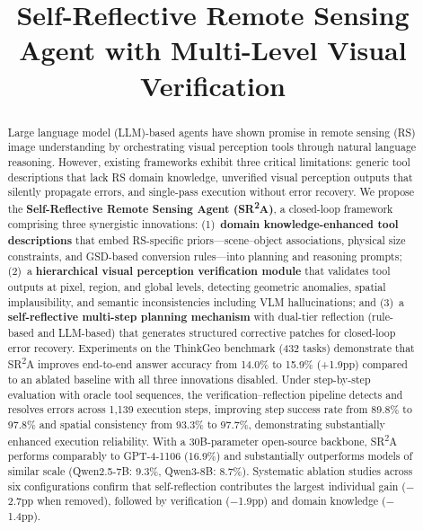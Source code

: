 \documentclass[journal]{IEEEtran}
\begin{document}
\title{Self-Reflective Remote Sensing Agent with Multi-Level Visual Verification}

\author{
}

\maketitle

\begin{abstract}
Large language model (LLM)-based agents have shown promise in remote sensing (RS) image understanding by orchestrating visual perception tools through natural language reasoning.
However, existing frameworks exhibit three critical limitations: generic tool descriptions that lack RS domain knowledge, unverified visual perception outputs that silently propagate errors, and single-pass execution without error recovery.
We propose the \textbf{Self-Reflective Remote Sensing Agent (SR\textsuperscript{2}A)}, a closed-loop framework comprising three synergistic innovations:
(1)~\textbf{domain knowledge-enhanced tool descriptions} that embed RS-specific priors---scene--object associations, physical size constraints, and GSD-based conversion rules---into planning and reasoning prompts;
(2)~a \textbf{hierarchical visual perception verification module} that validates tool outputs at pixel, region, and global levels, detecting geometric anomalies, spatial implausibility, and semantic inconsistencies including VLM hallucinations;
and (3)~a \textbf{self-reflective multi-step planning mechanism} with dual-tier reflection (rule-based and LLM-based) that generates structured corrective patches for closed-loop error recovery.
Experiments on the ThinkGeo benchmark (432 tasks) demonstrate that SR\textsuperscript{2}A improves end-to-end answer accuracy from 14.0\% to 15.9\% (+1.9pp) compared to an ablated baseline with all three innovations disabled.
Under step-by-step evaluation with oracle tool sequences, the verification--reflection pipeline detects and resolves errors across 1{,}139 execution steps, improving step success rate from 89.8\% to 97.8\% and spatial consistency from 93.3\% to 97.7\%, demonstrating substantially enhanced execution reliability.
With a 30B-parameter open-source backbone, SR\textsuperscript{2}A performs comparably to GPT-4-1106 (16.9\%) and substantially outperforms models of similar scale (Qwen2.5-7B: 9.3\%, Qwen3-8B: 8.7\%).
Systematic ablation studies across six configurations confirm that self-reflection contributes the largest individual gain ($-$2.7pp when removed), followed by verification ($-$1.9pp) and domain knowledge ($-$1.4pp).
\end{abstract}
\end{document}
